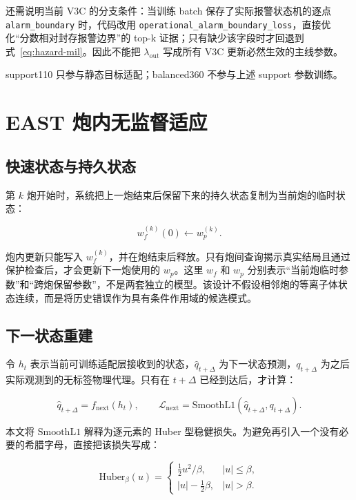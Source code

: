 \documentclass[11pt,a4paper]{article}
\newcommand{\code}[1]{\texttt{\small #1}}
\begin{document}
还需说明当前 V3C 的分支条件：当训练 batch 保存了实际报警状态机的逐点 \code{alarm\_boundary} 时，代码改用 \code{operational\_alarm\_boundary\_loss}，直接优化“分数相对封存报警边界”的 top-k 证据；只有缺少该字段时才回退到式~\eqref{eq:hazard-mil}。因此不能把 \(\lambda_{\mathrm{out}}\) 写成所有 V3C 更新必然生效的主线参数。

support110 只参与静态目标适配；balanced360 不参与上述 support 参数训练。

\section{EAST 炮内无监督适应}

\subsection{快速状态与持久状态}

第 \(k\) 炮开始时，系统把上一炮结束后保留下来的持久状态复制为当前炮的临时状态：

\begin{equation}
w_f^{(k)}(0)
\leftarrow
w_p^{(k)}.
\label{eq:fast-init}
\end{equation}

炮内更新只能写入 \(w_f^{(k)}\)，并在炮结束后释放。只有炮间查询揭示真实结局且通过保护检查后，才会更新下一炮使用的 \(w_p\)。这里 \(w_f\) 和 \(w_p\) 分别表示“当前炮临时参数”和“跨炮保留参数”，不是两套独立的模型。该设计不假设相邻炮的等离子体状态连续，而是将历史错误作为具有条件作用域的候选模式。

\subsection{下一状态重建}

令 \(h_t\) 表示当前可训练适配层接收到的状态，\(\widehat q_{t+\Delta}\) 为下一状态预测，\(q_{t+\Delta}\) 为之后实际观测到的无标签物理代理。只有在 \(t+\Delta\) 已经到达后，才计算：

\begin{equation}
\widehat q_{t+\Delta}=f_{\mathrm{next}}(h_t),
\qquad
\mathcal{L}_{\mathrm{next}}
=\mathrm{SmoothL1}
(\widehat q_{t+\Delta},q_{t+\Delta}).
\label{eq:next-loss}
\end{equation}

本文将 \(\mathrm{SmoothL1}\) 解释为逐元素的 Huber 型稳健损失。为避免再引入一个没有必要的希腊字母，直接把该损失写成：

\begin{equation}
\mathrm{Huber}_{\beta}(u)=
\begin{cases}
\frac{1}{2}u^2/\beta,&|u|\leq\beta,\\
|u|-\frac{1}{2}\beta,&|u|>\beta.
\end{cases}
\label{eq:smooth-l1}
\end{equation}
\end{document}

